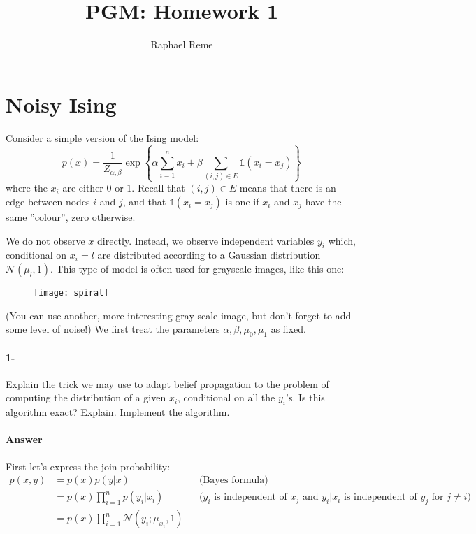 \documentclass{article}
\title{PGM: Homework 1}
\author{Raphael Reme}
\begin{document}
\maketitle

\section{Noisy Ising}
Consider a simple version of the Ising model:
\begin{equation*}
    p(x) = \frac{1}{Z_{\alpha, \beta}} \exp\left\{ \alpha \sum_{i=1}^nx_i + \beta \sum_{(i,j) \in E} \mathds{1}(x_i = x_j)\right\}
\end{equation*}
where the $x_i$ are either $0$ or $1$. Recall that $(i, j) \in E$ means that there is an edge between nodes $i$ and $j$, and
that $\mathds{1}(x_i = x_j)$ is one if $x_i$ and $x_j$ have the same ”colour”, zero otherwise.

We do not observe $x$ directly. Instead, we observe independent variables $y_i$ which, conditional on $x_i = l$
are distributed according to a Gaussian distribution $\mathcal{N}(\mu_l, 1)$. This type of model is often used for grayscale
images, like this one:

\begin{figure}[h!]
    \centering
    \texttt{[image: spiral]}
    \label{fig:spiral}
\end{figure}

(You can use another, more interesting gray-scale image, but don’t forget to add some level of noise!)
We first treat the parameters $\alpha, \beta, \mu_0, \mu_1$ as fixed.

\paragraph*{1-} Explain the trick we may use to adapt belief propagation to the problem of computing the distribution
of a given $x_i$, conditional on all the $y_i$’s. Is this algorithm exact? Explain. Implement the algorithm.
\paragraph*{Answer} First let's express the join probability:
\begin{equation*}
    \begin{aligned}
        p(x, y) & = p(x)p(y|x)                                      &  & \text{(Bayes formula)}                                                                      \\
                & = p(x)\prod_{i=1}^np(y_i|x_i)                     &  & \text{($y_i$ is independent of $x_j$ and $y_i|x_i$ is independent of $y_j$ for $j \neq i$)} \\
                & = p(x)\prod_{i=1}^n\mathcal{N}(y_i; \mu_{x_i}, 1)                                                                                                  \\
    \end{aligned}
\end{equation*}
\end{document}
